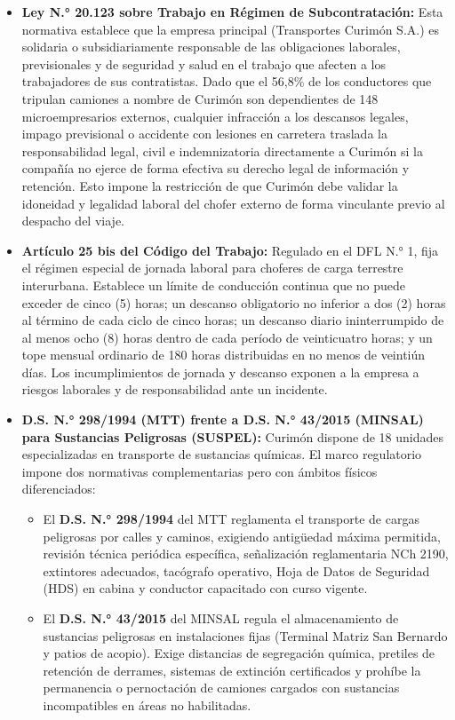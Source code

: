 \begin{itemize}
  \item \textbf{Ley N.° 20.123 sobre Trabajo en Régimen de Subcontratación:} Esta normativa establece que la empresa principal (Transportes Curimón S.A.) es solidaria o subsidiariamente responsable de las obligaciones laborales, previsionales y de seguridad y salud en el trabajo que afecten a los trabajadores de sus contratistas. Dado que el 56,8\% de los conductores que tripulan camiones a nombre de Curimón son dependientes de 148 microempresarios externos, cualquier infracción a los descansos legales, impago previsional o accidente con lesiones en carretera traslada la responsabilidad legal, civil e indemnizatoria directamente a Curimón si la compañía no ejerce de forma efectiva su derecho legal de información y retención. Esto impone la restricción de que Curimón debe validar la idoneidad y legalidad laboral del chofer externo de forma vinculante previo al despacho del viaje.
  \item \textbf{Artículo 25 bis del Código del Trabajo:} Regulado en el DFL N.° 1, fija el régimen especial de jornada laboral para choferes de carga terrestre interurbana. Establece un límite de conducción continua que no puede exceder de cinco (5) horas; un descanso obligatorio no inferior a dos (2) horas al término de cada ciclo de cinco horas; un descanso diario ininterrumpido de al menos ocho (8) horas dentro de cada período de veinticuatro horas; y un tope mensual ordinario de 180 horas distribuidas en no menos de veintiún días. Los incumplimientos de jornada y descanso exponen a la empresa a riesgos laborales y de responsabilidad ante un incidente.
  \item \textbf{D.S. N.° 298/1994 (MTT) frente a D.S. N.° 43/2015 (MINSAL) para Sustancias Peligrosas (SUSPEL):} Curimón dispone de 18 unidades especializadas en transporte de sustancias químicas. El marco regulatorio impone dos normativas complementarias pero con ámbitos físicos diferenciados:
  \begin{itemize}
    \item El \textbf{D.S. N.° 298/1994} del MTT reglamenta el transporte de cargas peligrosas por calles y caminos, exigiendo antigüedad máxima permitida, revisión técnica periódica específica, señalización reglamentaria NCh 2190, extintores adecuados, tacógrafo operativo, Hoja de Datos de Seguridad (HDS) en cabina y conductor capacitado con curso vigente.
    \item El \textbf{D.S. N.° 43/2015} del MINSAL regula el almacenamiento de sustancias peligrosas en instalaciones fijas (Terminal Matriz San Bernardo y patios de acopio). Exige distancias de segregación química, pretiles de retención de derrames, sistemas de extinción certificados y prohíbe la permanencia o pernoctación de camiones cargados con sustancias incompatibles en áreas no habilitadas.

\end{itemize}
\end{itemize}
